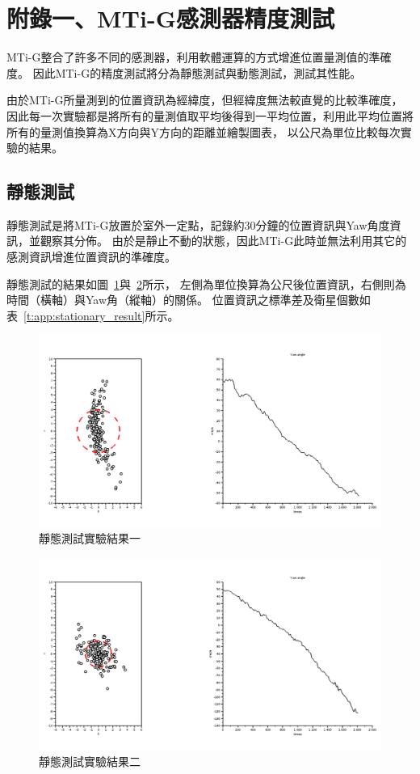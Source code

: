 \chapter*{附錄一、MTi-G感測器精度測試}
MTi-G整合了許多不同的感測器，利用軟體運算的方式增進位置量測值的準確度。
因此MTi-G的精度測試將分為靜態測試與動態測試，測試其性能。

由於MTi-G所量測到的位置資訊為經緯度，但經緯度無法較直覺的比較準確度，
因此每一次實驗都是將所有的量測值取平均後得到一平均位置，利用此平均位置將所有的量測值換算為X方向與Y方向的距離並繪製圖表，
以公尺為單位比較每次實驗的結果。

\section*{靜態測試}
靜態測試是將MTi-G放置於室外一定點，記錄約30分鐘的位置資訊與Yaw角度資訊，並觀察其分佈。
由於是靜止不動的狀態，因此MTi-G此時並無法利用其它的感測資訊增進位置資訊的準確度。

靜態測試的結果如圖~\ref{f:app:stationary_test_1}與~\ref{f:app:stationary_test_2}所示，
左側為單位換算為公尺後位置資訊，右側則為時間（橫軸）與Yaw角（縱軸）的關係。
位置資訊之標準差及衛星個數如表~\ref{t:app:stationary_result}所示。
\begin{figure}[h!]
	\centering
	\includegraphics[width=\textwidth]{figures/appendix1/stationary_test_1}
	\caption{靜態測試實驗結果一}
	\label{f:app:stationary_test_1}
\end{figure}

\begin{figure}[h!]
	\centering
	\includegraphics[width=\textwidth]{figures/appendix1/stationary_test_2}
	\caption{靜態測試實驗結果二}
	\label{f:app:stationary_test_2}
\end{figure}

